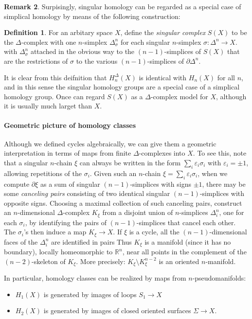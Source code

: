 \documentclass[11pt,a4paper]{article}
\theoremstyle{definition}
\newtheorem{definition}{Definition}[section]
\newtheorem{remark}[definition]{Remark}
\theoremstyle{plain}
\theoremstyle{remark}
\begin{document}
\begin{remark}
Surpisingly, singular homology can be regarded as a special case of simplical homology by means of the following 
construction: 
\begin{definition}
  \item For an arbitary space $X$, define the \emph{singular complex} $S(X)$ to be the $\Delta$-complex
  with one $n$-simplex $\Delta^n_\sigma$ for each singular $n$-simplex $\sigma \colon \Delta^n \to X$. 
  with $\Delta_\sigma^n$ attached in the obvious way to the $(n-1)$-simplices of $S(X)$ 
  that are the restrictions of $\sigma$ to the various $(n-1)$-simplices of $\partial \Delta^n$.
\end{definition}
It is clear from this deifnition that $H_n^\Delta (X)$ is identical with $H_n(X)$ for all $n$, and in this sense 
the singular homology groups are a special case of a simplical homology group. 
Once can regard $S(X)$ as a $\Delta$-complex model for $X$, although it is usually much larget than $X$.

\paragraph{Geometric picture of homology classes} 
Although we defined cycles algebraically, we can give them a geometric interpretation in terms 
of maps from finite $\Delta$-complexes into $X$. To see this, note that a singular $n$-chain $\xi$ can always 
be written in the form $\sum_i \varepsilon_i \sigma_i$ with $\varepsilon_i = \pm 1$, allowing repetitions of the 
$\sigma_i$. Given such an $n$-chain $\xi = \sum_i \varepsilon_i \sigma_i$, 
when we compute $\partial \xi$ as a sum of singular $(n-1)$-simplices with signs $\pm 1$, 
there may be some \emph{canceling pairs} consisting of two identical singular $(n-1)$-simplices with opposite 
signs. 
Choosing a maximal collection of such canceling pairs, construct an $n$-dimensional $\Delta$-complex 
$K_\xi$ from a disjoint union of $n$-simplices $\Delta_i^n$, one for each $\sigma_i$, 
by identifying the pairs of $(n-1)$-simplices that cancel each other. The $\sigma_i$'s then induce a map 
$K_\xi \to X$. If $\xi$ is a cycle, all the $(n-1)$-dimensional faces of the $\Delta_i^n$ are identified in pairs 
Thus $K_\xi$ is a manifold (since it has no boundary), locally homeomorphic to $\mathbb{R}^n$, near all points in the complement 
of the $(n-2)$-skeleton of $K_\xi$. More precisely: $K_\xi \setminus K^{n-2}_\xi$ is an oriented 
$n$-manifold. 

In particular, homology classes can be realized by maps from $n$-pseudomanifolds: 
\begin{itemize} 
  \item $H_1(X)$ is generated by images of loops $S_1 \to X$ 
  \item $H_2 (X)$ is generated by images of closed oriented surfaces $\Sigma \to X$. 
\end{itemize}


\end{remark}
\end{document}
